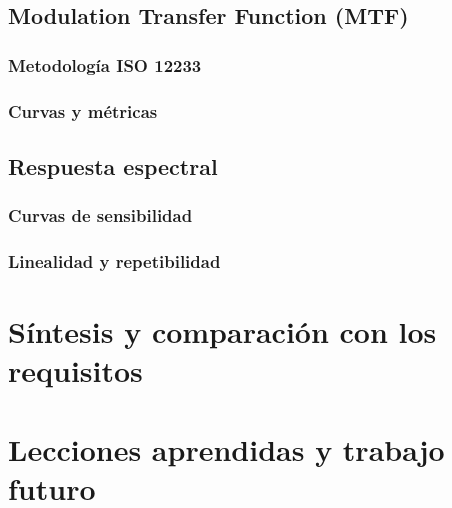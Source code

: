     
  \subsection{Modulation Transfer Function (MTF)}
    \subsubsection{Metodología ISO 12233}
    \subsubsection{Curvas y métricas}

  \subsection{Respuesta espectral}
    \subsubsection{Curvas de sensibilidad}
    \subsubsection{Linealidad y repetibilidad}

\section{Síntesis y comparación con los requisitos}

\section{Lecciones aprendidas y trabajo futuro}

